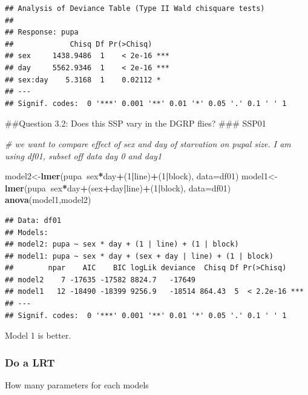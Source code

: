 \documentclass[
]{article}
\newenvironment{Shaded}{\begin{snugshade}}{\end{snugshade}}
\newcommand{\CommentTok}[1]{\textcolor[rgb]{0.56,0.35,0.01}{\textit{#1}}}
\newcommand{\DataTypeTok}[1]{\textcolor[rgb]{0.13,0.29,0.53}{#1}}
\newcommand{\DecValTok}[1]{\textcolor[rgb]{0.00,0.00,0.81}{#1}}
\newcommand{\KeywordTok}[1]{\textcolor[rgb]{0.13,0.29,0.53}{\textbf{#1}}}
\newcommand{\NormalTok}[1]{#1}
\newcommand{\OperatorTok}[1]{\textcolor[rgb]{0.81,0.36,0.00}{\textbf{#1}}}
\begin{document}
\begin{verbatim}
## Analysis of Deviance Table (Type II Wald chisquare tests)
## 
## Response: pupa
##             Chisq Df Pr(>Chisq)    
## sex     1438.9486  1    < 2e-16 ***
## day     5562.9346  1    < 2e-16 ***
## sex:day    5.3168  1    0.02112 *  
## ---
## Signif. codes:  0 '***' 0.001 '**' 0.01 '*' 0.05 '.' 0.1 ' ' 1
\end{verbatim}

\#\#Question 3.2: Does this SSP vary in the DGRP flies? \#\#\# SSP01

\begin{Shaded}
\begin{Highlighting}[]
\CommentTok{# we want to compare effect of sex and day of starvation on pupal size. I am using df01, subset off data day 0 and day1}

\NormalTok{model2<-}\KeywordTok{lmer}\NormalTok{(pupa}\OperatorTok{~}\NormalTok{sex}\OperatorTok{*}\NormalTok{day}\OperatorTok{+}\NormalTok{(}\DecValTok{1}\OperatorTok{|}\NormalTok{line)}\OperatorTok{+}\NormalTok{(}\DecValTok{1}\OperatorTok{|}\NormalTok{block), }\DataTypeTok{data=}\NormalTok{df01)}
\NormalTok{model1<-}\KeywordTok{lmer}\NormalTok{(pupa}\OperatorTok{~}\NormalTok{sex}\OperatorTok{*}\NormalTok{day}\OperatorTok{+}\NormalTok{(sex}\OperatorTok{+}\NormalTok{day}\OperatorTok{|}\NormalTok{line)}\OperatorTok{+}\NormalTok{(}\DecValTok{1}\OperatorTok{|}\NormalTok{block), }\DataTypeTok{data=}\NormalTok{df01)}
\KeywordTok{anova}\NormalTok{(model1,model2)}
\end{Highlighting}
\end{Shaded}

\begin{verbatim}
## Data: df01
## Models:
## model2: pupa ~ sex * day + (1 | line) + (1 | block)
## model1: pupa ~ sex * day + (sex + day | line) + (1 | block)
##        npar    AIC    BIC logLik deviance  Chisq Df Pr(>Chisq)    
## model2    7 -17635 -17582 8824.7   -17649                         
## model1   12 -18490 -18399 9256.9   -18514 864.43  5  < 2.2e-16 ***
## ---
## Signif. codes:  0 '***' 0.001 '**' 0.01 '*' 0.05 '.' 0.1 ' ' 1
\end{verbatim}

Model 1 is better.

\hypertarget{do-a-lrt-3}{%
\subsubsection{Do a LRT}\label{do-a-lrt-3}}

How many parameters for each models
\end{document}
